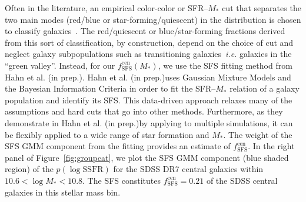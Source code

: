 \documentclass[12pt, letterpaper, preprint]{aastex}
\newcommand{\todo}[1]{{\bf \textcolor{red}{#1}}}
\newcommand{\hahngmm}{Hahn et al. (in prep.)}
\begin{document}
Often in the literature, an empirical color-color or SFR--$M_*$ cut 
that separates the two main modes (red/blue or star-forming/quiescent) 
in the distribution is chosen to classify 
galaxies~\citep[\emph{e.g.}][]{baldry2006, blanton2009, drory2009, peng2010, moustakas2013, hahn2015}.
The red/quiescent or blue/star-forming fractions derived from this sort 
of classification, by construction, depend on the choice of cut and 
neglect galaxy subpopulations such as transitioning galaxies~\emph{i.e.} 
galaxies in the ``green valley''. Instead, for our 
$f^\mathrm{cen}_\mathrm{SFS}(M_*)$, we use the SFS fitting method 
from \hahngmm. \hahngmm uses Gaussian Mixture Models and the Bayesian 
Information Criteria in order to fit the SFR--$M_*$ relation of a galaxy 
population and identify its SFS. This data-driven approach relaxes 
many of the assumptions and hard cuts that go into other methods. 
Furthermore, as they demonstrate in \hahngmm by applying to multiple 
simulations, it can be flexibly applied to a wide range of star 
formation and $M_*$. The weight of the SFS GMM component from the 
fitting provides an estimate of $f^\mathrm{cen}_\mathrm{SFS}$. 
In the right panel of Figure~\ref{fig:groupcat}, we plot the SFS 
GMM component (blue shaded region) of the $p(\log \mathrm{SSFR})$ 
for the SDSS DR7 central galaxies within $10.6 < \log M_* < 10.8$. 
The SFS constitutes $f^\mathrm{cen}_\mathrm{SFS} = 0.21$ of the 
SDSS central galaxies in this stellar mass bin. 

\end{document}
